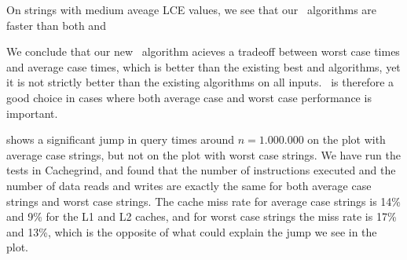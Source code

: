 \documentclass[a4]{article}
\begin{document}
On strings with medium aveage LCE values, we see that our \fprintk\ algorithms are faster than both  and 

We conclude that our new \fprintk\ algorithm acieves a tradeoff between worst case times and average case times, which is better than the existing best  and  algorithms, yet it is not strictly better than the existing algorithms on all inputs. \fprintk\ is therefore a good choice in cases where both average case and worst case performance is important.


\ifarticle

 shows a significant jump in query times around $n=1.000.000$ on the plot with average case strings, but not on the plot with worst case strings. We have run the tests in Cachegrind, and found that the number of instructions executed and the number of data reads and writes are exactly the same for both average case strings and worst case strings. The cache miss rate for average case strings is 14\% and 9\% for the L1 and L2 caches, and for worst case strings the miss rate is 17\% and 13\%, which is the opposite of what could explain the jump we see in the plot.

\fi %


\ifreport
\end{document}

